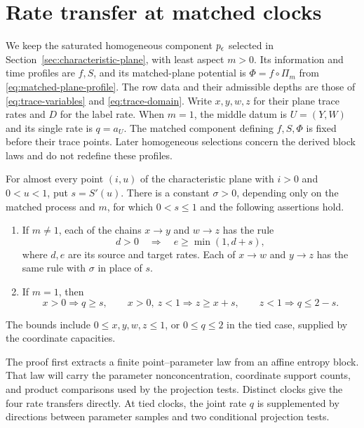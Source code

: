 \section{Rate transfer at matched clocks}
\label{sec:rate-transfer}

We keep the saturated homogeneous component $p_\epsilon$ selected in
Section~\ref{sec:characteristic-plane}, with least aspect $m>0$.
Its information and time profiles are $f,S$, and its matched-plane
potential is $\Phi=f\circ\Pi_m$ from
\eqref{eq:matched-plane-profile}.  The row data and their admissible
depths are those of \eqref{eq:trace-variables} and
\eqref{eq:trace-domain}.  Write $x,y,w,z$ for their plane trace rates
and $D$ for the label rate.  When $m=1$, the middle datum is
$U=(Y,W)$ and its single rate is $q=a_U$.  The matched component
defining $f,S,\Phi$ is fixed before their trace points.  Later
homogeneous selections concern the derived block laws and do not
redefine these profiles.

\begin{proposition}
\label{prop:rate-transfer}
For almost every point $(i,u)$ of the characteristic plane with $i>0$
and $0<u<1$, put $s=S'(u)$.  There is a constant $\sigma>0$,
depending only on the matched process and $m$, for which $0<s\le1$
and the following assertions hold.
\begin{enumerate}
\item If $m\ne1$, each of the chains $x\longrightarrow y$ and
$w\longrightarrow z$ has the rule
\[
 d>0\quad\Longrightarrow\quad e\ge\min(1,d+s),
\]
where $d,e$ are its source and target rates.  Each of
$x\longrightarrow w$ and $y\longrightarrow z$ has the same rule
with $\sigma$ in place of $s$.
\item If $m=1$, then
\[
 x>0\Longrightarrow q\ge s,\qquad
 x>0,\ z<1\Longrightarrow z\ge x+s,\qquad
 z<1\Longrightarrow q\le2-s.
\]
\end{enumerate}
The bounds include $0\le x,y,w,z\le1$, or $0\le q\le2$ in
the tied case, supplied by the coordinate capacities.
\end{proposition}

The proof first extracts a finite point--parameter law from an
affine entropy block.  That law will carry the parameter
nonconcentration, coordinate support counts, and product comparisons
used by the projection tests.  Distinct clocks give the four
rate transfers directly.  At tied clocks, the joint rate $q$ is
supplemented by directions between parameter samples and two
conditional projection tests.

